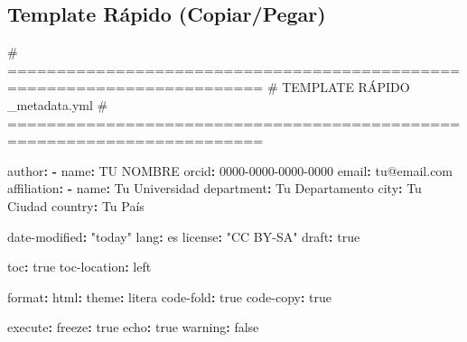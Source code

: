 \documentclass[
  doc,
  floatsintext,
  longtable,
  a4paper,
  nolmodern,
  notxfonts,
  notimes,
  12pt,
  colorlinks=true,linkcolor=blue,citecolor=blue,urlcolor=blue]{apa7}
\newenvironment{Shaded}{\begin{snugshade}}{\end{snugshade}}
\newcommand{\AttributeTok}[1]{\textcolor[rgb]{0.40,0.45,0.13}{#1}}
\newcommand{\CharTok}[1]{\textcolor[rgb]{0.13,0.47,0.30}{#1}}
\newcommand{\CommentTok}[1]{\textcolor[rgb]{0.37,0.37,0.37}{#1}}
\newcommand{\FunctionTok}[1]{\textcolor[rgb]{0.28,0.35,0.67}{#1}}
\newcommand{\KeywordTok}[1]{\textcolor[rgb]{0.00,0.23,0.31}{\textbf{#1}}}
\newcommand{\StringTok}[1]{\textcolor[rgb]{0.13,0.47,0.30}{#1}}
\begin{document}
\subsection{Template Rápido
(Copiar/Pegar)}\label{template-ruxe1pido-copiarpegar}

\begin{Shaded}
\begin{Highlighting}[]
\CommentTok{\# ========================================================================}
\CommentTok{\# TEMPLATE RÁPIDO \_metadata.yml}
\CommentTok{\# ========================================================================}

\FunctionTok{author}\KeywordTok{:}
\AttributeTok{  }\KeywordTok{{-}}\AttributeTok{ }\FunctionTok{name}\KeywordTok{:}\AttributeTok{ TU NOMBRE}
\AttributeTok{    }\FunctionTok{orcid}\KeywordTok{:}\AttributeTok{ 0000{-}0000{-}0000{-}0000}
\AttributeTok{    }\FunctionTok{email}\KeywordTok{:}\AttributeTok{ tu@email.com}
\AttributeTok{    }\FunctionTok{affiliation}\KeywordTok{:}
\AttributeTok{      }\KeywordTok{{-}}\AttributeTok{ }\FunctionTok{name}\KeywordTok{:}\AttributeTok{ Tu Universidad}
\AttributeTok{        }\FunctionTok{department}\KeywordTok{:}\AttributeTok{ Tu Departamento}
\AttributeTok{        }\FunctionTok{city}\KeywordTok{:}\AttributeTok{ Tu Ciudad}
\AttributeTok{        }\FunctionTok{country}\KeywordTok{:}\AttributeTok{ Tu País}

\FunctionTok{date{-}modified}\KeywordTok{:}\AttributeTok{ }\StringTok{"today"}
\FunctionTok{lang}\KeywordTok{:}\AttributeTok{ es}
\FunctionTok{license}\KeywordTok{:}\AttributeTok{ }\StringTok{"CC BY{-}SA"}
\FunctionTok{draft}\KeywordTok{:}\AttributeTok{ }\CharTok{true}

\FunctionTok{toc}\KeywordTok{:}\AttributeTok{ }\CharTok{true}
\FunctionTok{toc{-}location}\KeywordTok{:}\AttributeTok{ left}

\FunctionTok{format}\KeywordTok{:}
\AttributeTok{  }\FunctionTok{html}\KeywordTok{:}
\AttributeTok{    }\FunctionTok{theme}\KeywordTok{:}\AttributeTok{ litera}
\AttributeTok{    }\FunctionTok{code{-}fold}\KeywordTok{:}\AttributeTok{ }\CharTok{true}
\AttributeTok{    }\FunctionTok{code{-}copy}\KeywordTok{:}\AttributeTok{ }\CharTok{true}

\FunctionTok{execute}\KeywordTok{:}
\AttributeTok{  }\FunctionTok{freeze}\KeywordTok{:}\AttributeTok{ }\CharTok{true}
\AttributeTok{  }\FunctionTok{echo}\KeywordTok{:}\AttributeTok{ }\CharTok{true}
\AttributeTok{  }\FunctionTok{warning}\KeywordTok{:}\AttributeTok{ }\CharTok{false}
\end{Highlighting}
\end{Shaded}
\end{document}
